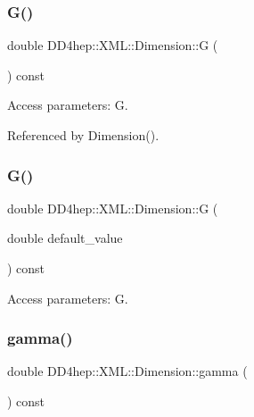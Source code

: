 \subsubsection{\texorpdfstring{G()}{G()}\hspace{0.1cm}{\footnotesize\ttfamily [1/2]}}
{\footnotesize\ttfamily double D\+D4hep\+::\+X\+M\+L\+::\+Dimension\+::G (\begin{DoxyParamCaption}{ }\end{DoxyParamCaption}) const}



Access parameters\+: G. 



Referenced by Dimension().

\hypertarget{struct_d_d4hep_1_1_x_m_l_1_1_dimension_a855a8722c86aff07bcd75390b0e62cd5}{}\label{struct_d_d4hep_1_1_x_m_l_1_1_dimension_a855a8722c86aff07bcd75390b0e62cd5} 
\subsubsection{\texorpdfstring{G()}{G()}\hspace{0.1cm}{\footnotesize\ttfamily [2/2]}}
{\footnotesize\ttfamily double D\+D4hep\+::\+X\+M\+L\+::\+Dimension\+::G (\begin{DoxyParamCaption}\item[{double}]{default\+\_\+value }\end{DoxyParamCaption}) const}



Access parameters\+: G. 

\hypertarget{struct_d_d4hep_1_1_x_m_l_1_1_dimension_a32543935ed14ad6c71ace2c4d1ddd3a8}{}\label{struct_d_d4hep_1_1_x_m_l_1_1_dimension_a32543935ed14ad6c71ace2c4d1ddd3a8} 
\subsubsection{\texorpdfstring{gamma()}{gamma()}\hspace{0.1cm}{\footnotesize\ttfamily [1/2]}}
{\footnotesize\ttfamily double D\+D4hep\+::\+X\+M\+L\+::\+Dimension\+::gamma (\begin{DoxyParamCaption}{ }\end{DoxyParamCaption}) const}



